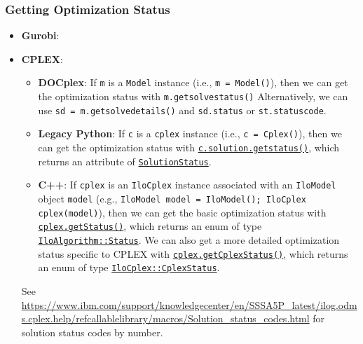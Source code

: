 \documentclass[12pt]{article}
\begin{document}
\subsubsection{Getting Optimization Status}
\begin{itemize}
    \item \textbf{Gurobi}:
    \item \textbf{CPLEX}:
        \begin{itemize}
            \item \textbf{DOCplex}: If \texttt{m} is a \texttt{Model} instance (i.e., \texttt{m = Model()}), then we can get the optimization status with
                \texttt{m.get\ttul solve\ttul status()}
                Alternatively, we can use \texttt{sd = m.get\ttul solve\ttul details()} and \texttt{sd.status} or \texttt{st.status\ttul code}.
            \item \textbf{Legacy Python}: If \texttt{c} is a \texttt{cplex} instance (i.e., \texttt{c = Cplex()}), then we can get the optimization status with \href{https://www.ibm.com/support/knowledgecenter/SSSA5P_latest/ilog.odms.cplex.help/refpythoncplex/html/cplex._internal._subinterfaces.SolutionInterface-class.html#get_status}{\texttt{c.solution.get\ttul status()}}, which returns an attribute of \href{https://www.ibm.com/support/knowledgecenter/SSSA5P_latest/ilog.odms.cplex.help/refpythoncplex/html/cplex._internal._subinterfaces.SolutionStatus-class.html}{\texttt{SolutionStatus}}.
            \item \textbf{C++}: If \texttt{cplex} is an \texttt{IloCplex} instance associated with an \texttt{IloModel} object \texttt{model} (e.g., \texttt{IloModel model = IloModel(); IloCplex cplex(model)}), then we can get the basic optimization status with \href{https://www.ibm.com/support/knowledgecenter/SSSA5P_latest/ilog.odms.cplex.help/refcppcplex/html/classes/IloCplex.html#method_getStatus}{\texttt{cplex.getStatus()}}, which returns an enum of type \href{https://www.ibm.com/support/knowledgecenter/SSSA5P_latest/ilog.odms.cplex.help/refcppcplex/html/enumerations/IloAlgorithm_Status.html}{\texttt{IloAlgorithm::Status}}.  We can also get a more detailed optimization status specific to CPLEX with \href{https://www.ibm.com/support/knowledgecenter/SSSA5P_latest/ilog.odms.cplex.help/refcppcplex/html/classes/IloCplex.html#method_getCplexStatus}{\texttt{cplex.getCplexStatus()}}, which returns an enum of type \href{https://www.ibm.com/support/knowledgecenter/SSSA5P_latest/ilog.odms.cplex.help/refcppcplex/html/enumerations/IloCplex_CplexStatus.html}{\texttt{IloCplex::CplexStatus}}.
        \end{itemize}

        See \url{https://www.ibm.com/support/knowledgecenter/en/SSSA5P_latest/ilog.odms.cplex.help/refcallablelibrary/macros/Solution_status_codes.html} for solution status codes by number.
\end{itemize}
\end{document}
